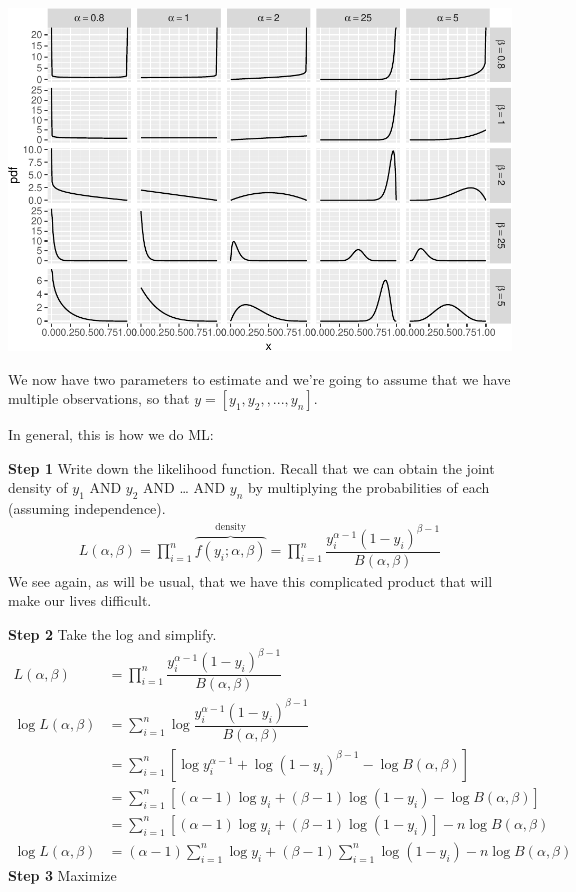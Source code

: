 \documentclass[
]{book}
\begin{document}
\includegraphics{01-01-maximum-likelihood_files/figure-latex/unnamed-chunk-3-1.pdf}

We now have two parameters to estimate and we're going to assume that we
have multiple observations, so that \(y = [y_1, y_2, ,..., y_n]\).

In general, this is how we do ML:

\textbf{Step 1} Write down the likelihood function. Recall that we can
obtain the joint density of \(y_1\) AND \(y_2\) AND \ldots{} AND \(y_n\)
by multiplying the probabilities of each (assuming independence). \[
\begin{aligned}
L(\alpha, \beta) = \displaystyle\prod_{i = 1}^n \overbrace{f(y_i;\alpha, \beta)}^{\text{density}} = \displaystyle\prod_{i = 1}^n \dfrac{y_i^{\alpha - 1}(1 - y_i)^{\beta - 1}}{B(\alpha, \beta)}
\end{aligned}
\] We see again, as will be usual, that we have this complicated product
that will make our lives difficult.

\textbf{Step 2} Take the log and simplify. \[
\begin{aligned}
L(\alpha, \beta) &= \displaystyle\prod_{i = 1}^n \dfrac{y_i^{\alpha - 1}(1 - y_i)^{\beta - 1}}{B(\alpha, \beta)}\\
\log L(\alpha, \beta) &= \displaystyle\sum_{i = 1}^n \log \dfrac{y_i^{\alpha - 1}(1 - y_i)^{\beta - 1}}{B(\alpha, \beta)}\\
&= \displaystyle\sum_{i = 1}^n \left[ \log y_i^{\alpha - 1} + \log (1 - y_i)^{\beta - 1} - \log B(\alpha, \beta)\right]\\
&= \displaystyle\sum_{i = 1}^n \left[ (\alpha - 1)\log y_i + (\beta - 1)\log (1 - y_i) - \log B(\alpha, \beta)\right]\\
&= \displaystyle\sum_{i = 1}^n \left[ (\alpha - 1)\log y_i + (\beta - 1)\log (1 - y_i)\right] - n \log B(\alpha, \beta)\\
\log L(\alpha, \beta) &= (\alpha - 1) \sum_{i = 1}^n \log y_i + (\beta - 1) \sum_{i = 1}^n \log (1 - y_i) - n \log B(\alpha, \beta)
\end{aligned}
\] \textbf{Step 3} Maximize
\end{document}
